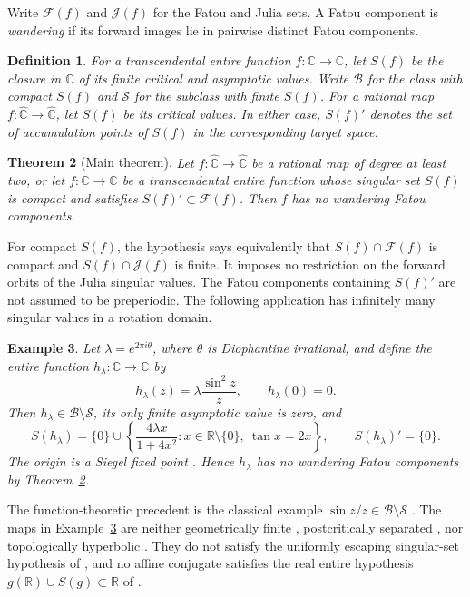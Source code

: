 \documentclass[10pt,a4paper]{amsart}
\newcommand{\C}{\mathbb C}
\newcommand{\R}{\mathbb R}
\newcommand{\sphere}{\widehat{\mathbb C}}
\newcommand{\Fat}{\mathcal F}
\newcommand{\Jul}{\mathcal J}
\newtheorem{theorem}{Theorem}[section]
\newtheorem{definition}[theorem]{Definition}
\newtheorem{example}[theorem]{Example}
\numberwithin{equation}{section}
\begin{document}
Write $\Fat(f)$ and $\Jul(f)$ for the Fatou and Julia sets. A Fatou
component is \emph{wandering} if its forward images lie in pairwise
distinct Fatou components.

\begin{definition}\label{def:singular}
For a transcendental entire function $f:\C\to\C$, let $S(f)$ be the closure in
$\C$ of its finite critical and asymptotic values.
Write $\mathcal B$ for the class with
compact $S(f)$ and $\mathcal S$ for the subclass with finite $S(f)$.
For a rational map $f:\sphere\to\sphere$, let $S(f)$ be its critical values.
In either case, $S(f)'$ denotes the set of accumulation points of $S(f)$
in the corresponding target space.
\end{definition}


\begin{theorem}[Main theorem]\label{core:singular-accumulation}
Let $f:\sphere\to\sphere$ be a rational map of degree at least two,
or let $f:\C\to\C$ be a transcendental entire function whose singular
set $S(f)$ is compact and satisfies $S(f)'\subset\Fat(f)$.
Then $f$ has no wandering Fatou components.
\end{theorem}


For compact $S(f)$, the hypothesis says equivalently that
$S(f)\cap\Fat(f)$ is compact and $S(f)\cap\Jul(f)$ is finite. It
imposes no restriction on the forward orbits of the Julia singular
values. The Fatou components containing $S(f)'$ are not assumed to be
preperiodic. The following application has infinitely many singular
values in a rotation domain.

\begin{example}\label{example:sine}
Let $\lambda=e^{2\pi i\theta}$, where $\theta$ is Diophantine irrational,
and define the entire function $h_\lambda:\C\to\C$ by
\[
 h_\lambda(z)=\lambda\frac{\sin^2z}{z},\qquad h_\lambda(0)=0.
\]
Then $h_\lambda\in\mathcal B\setminus\mathcal S$, its only finite
asymptotic value is zero, and
\begin{equation}\label{eq:sine-singular}
 S(h_\lambda)=\{0\}\cup
 \left\{\frac{4\lambda x}{1+4x^2}:
 x\in\R\setminus\{0\},\ \tan x=2x\right\},
 \qquad S(h_\lambda)'=\{0\}.
\end{equation}
The origin is a Siegel fixed point \cite{Siegel}. Hence $h_\lambda$ has no wandering
Fatou components by Theorem~\ref{core:singular-accumulation}.
\end{example}

The function-theoretic precedent is the classical example
$\sin z/z\in\mathcal B\setminus\mathcal S$
\cite[Section~4.2]{Sixsmith}. The maps in Example~\ref{example:sine}
are neither geometrically finite \cite[Proposition~5.3]{ARS}, postcritically
separated \cite[Lemma~2.6]{PS}, nor topologically hyperbolic
\cite[Definition~1.2]{BFJK}. They do not satisfy the uniformly escaping
singular-set hypothesis of \cite[Theorem~1.2]{MBRG}, and no affine
conjugate satisfies the real entire hypothesis
$g(\R)\cup S(g)\subset\R$ of \cite[Theorem~1.3]{MBRG}.
\end{document}
